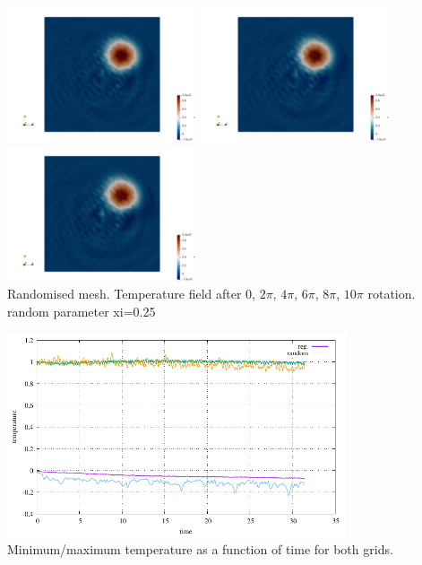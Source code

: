 \begin{center}
\includegraphics[width=5.6cm]{python_codes/fieldstone_45/results/random/T.0003.png}
\includegraphics[width=5.6cm]{python_codes/fieldstone_45/results/random/T.0004.png}
\includegraphics[width=5.6cm]{python_codes/fieldstone_45/results/random/T.0005.png}\\
{\captionfont Randomised mesh. Temperature field after 0, $2\pi$, $4\pi$, $6\pi$, $8\pi$, $10\pi$ rotation.
random parameter xi=0.25} 
\end{center}

\begin{center}
\includegraphics[width=10cm]{python_codes/fieldstone_45/results/T.pdf}\\
{\captionfont Minimum/maximum temperature as a function of time for both grids.} 
\end{center}
